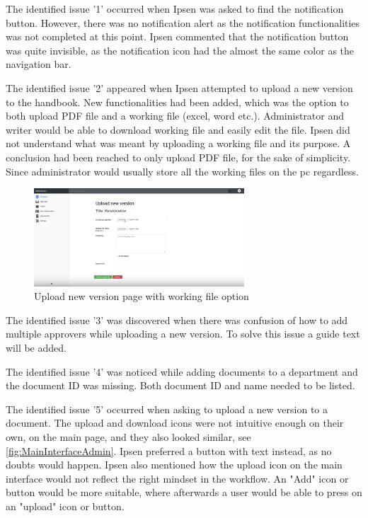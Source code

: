 \documentclass[../../master.tex]{subfiles}
\begin{document}
The identified issue '1' occurred when Ipsen was asked to find the notification button.
However, there was no notification alert as the notification functionalities was not completed at this point.
Ipsen commented that the notification button was quite invisible, as the notification icon had the almost the same color as the navigation bar.

The identified issue '2' appeared when Ipsen attempted to upload a new version to the handbook.
New functionalities had been added, which was the option to both upload PDF file and a working file (excel, word etc.).
Administrator and writer would be able to download working file and easily edit the file.
Ipsen did not understand what was meant by uploading a working file and its purpose.
A conclusion had been reached to only upload PDF file, for the sake of simplicity.
Since administrator would usually store all the working files on the pc regardless.

\begin{figure}[H]
	\centering
		\includegraphics[width=0.7\textwidth]{billeder/WorkingFile.png}
	\caption{Upload new version page with working file option}\label{fig:WorkingFile}
\end{figure}

The identified issue '3' was discovered when there was confusion of how to add multiple approvers while uploading a new version.
To solve this issue a guide text will be added.

The identified issue '4' was noticed while adding documents to a department and the document ID was missing.
Both document ID and name needed to be listed.

The identified issue '5' occurred when asking to upload a new version to a document.
The upload and download icons were not intuitive enough on their own, on the main page, and they also looked similar, see \cref{fig:MainInterfaceAdmin}.
Ipsen preferred a button with text instead, as no doubts would happen.
Ipsen also mentioned how the upload icon on the main interface would not reflect the right mindset in the workflow.
An "Add" icon or button would be more suitable, where afterwards a user would be able to press on an "upload" icon or button.
\end{document}
